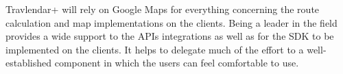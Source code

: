 Travlendar+ will rely on Google Maps for everything concerning the route calculation and map implementations on the clients. Being a leader in the field provides a wide support to the APIs integrations as well as for the SDK to be implemented on the clients.
It helps to delegate much of the effort to a well-established component in which the users can feel comfortable to use.